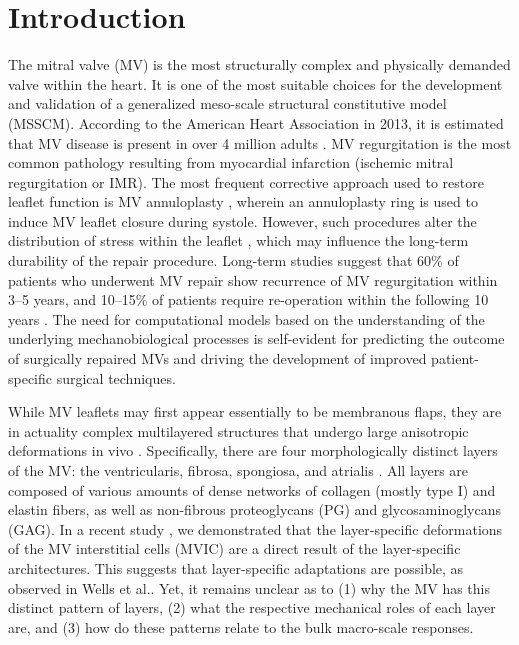 \section{Introduction}
    
    The mitral valve (MV) is the most structurally complex and physically demanded valve within the heart. It is one of the most suitable choices for the development and validation of a generalized meso-scale structural constitutive model (MSSCM). According to the American Heart Association in 2013, it is estimated that MV disease is present in over 4 million adults \cite{go_heart_2013}. MV regurgitation is the most common pathology resulting from myocardial infarction (ischemic mitral regurgitation or IMR). The most frequent corrective approach used to restore leaflet function is MV annuloplasty \cite{kaneko_mitral_2014, amini_vivo_2012}, wherein an annuloplasty ring is used to induce MV leaflet closure during systole. However, such procedures alter the distribution of stress within the leaflet \cite{amini_vivo_2012,salgo_effect_2002,mahmood_three_2009,jimenez_saddle_2007,padala_saddle_2009,sacks_vivo_2006,eckert_vivo_2009,rausch_vivo_2011}, which may influence the long-term durability of the repair procedure. Long-term studies suggest that 60\% of patients who underwent MV repair show recurrence of MV regurgitation within 3–5 years, and 10–15\% of patients require re-operation within the following 10 years \cite{flameng_recurrence_2003,flameng_durability_2008}. The need for computational models based on the understanding of the underlying mechanobiological processes is self-evident for predicting the outcome of surgically repaired MVs and driving the development of improved patient-specific surgical techniques.
    
    
    While MV leaflets may first appear essentially to be membranous flaps, they are in actuality complex multilayered structures that undergo large anisotropic deformations in vivo \cite{sacks_vivo_2006}. Specifically, there are four morphologically distinct layers of the MV: the ventricularis, fibrosa, spongiosa, and atrialis \cite{carruthers_alterations_2012}. All layers are composed of various amounts of dense networks of collagen (mostly type I) and elastin fibers, as well as non-fibrous proteoglycans (PG) and glycosaminoglycans (GAG). In a recent study \cite{lee_quantification_2015}, we demonstrated that the layer-specific deformations of the MV interstitial cells (MVIC) are a direct result of the layer-specific architectures. This suggests that layer-specific adaptations are possible, as observed in Wells et al.\cite{wells_physiological_2012}. Yet, it remains unclear as to (1) why the MV has this distinct pattern of layers, (2) what the respective mechanical roles of each layer are, and (3) how do these patterns relate to the bulk macro-scale responses.
    
